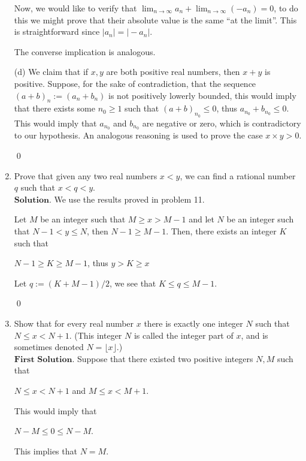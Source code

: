 \documentclass{article}
\theoremstyle{remark}
\begin{document}
\begin{enumerate}
        Now, we would like to verify that $\lim_{n\to\infty}a_n + \lim_{n\to\infty}(-a_n) = 0$,
        to do this we might prove that their absolute value is the same ``at the limit''.
        This is straightforward since $\vert a_n \vert = \vert -a_n \vert$.

        The converse implication is analogous.

        (d) We claim that if $x, y$ are both positive real numbers, then $x + y$ is positive.
        Suppose, for the sake of contradiction, that the sequence $(a + b)_n := (a_n + b_n)$ is not positively lowerly
        bounded, this would imply that there exists some $n_0 \geq 1$ such that $(a+b)_{n_0} \leq 0$, thus $a_{n_0}+b_{n_0} \leq 0$.
        This would imply that $a_{n_0}$ and $b_{n_0}$ are negative or zero, which is contradictory to our hypothesis.
        An analogous reasoning is used to prove the case $x \times y > 0$.

        \begin{flushleft}
            \qed
        \end{flushleft}
        \item Prove that given any two real numbers \( x < y \), 
        we can find a rational number \( q \) such that \( x < q < y \).\\
        $\textbf{Solution.}$
        We use the results proved in problem 11.

        Let $M$ be an integer such that $M \geq x > M-1$ and let $N$ be an integer such that $N - 1 < y \leq N$,
        then $N-1 \geq M-1$. Then, there exists an integer $K$ such that
        \begin{center}
            $N-1 \geq K \geq M-1$, thus $y > K \geq x$
        \end{center}
        Let $q := (K+M-1)/2$, we see that $K \leq q \leq M-1$.

        \begin{flushleft}
            \qed
        \end{flushleft}

        \item Show that for every real number \( x \) there is exactly one integer \( N \) such that 
        \( N \leq x < N + 1 \). (This integer \( N \) is called the integer part of \( x \), 
        and is sometimes denoted \( N = \lfloor x \rfloor \).)\\
        $\textbf{First Solution.}$ Suppose that there existed two positive integers $N, M$ such that 
        \begin{center}
            $N \leq x < N + 1$ and $M \leq x < M + 1$.
        \end{center}
        This would imply that 
        \begin{center}
            $N - M \leq 0 \leq N - M$.
        \end{center}
        This implies that $N = M$.


\end{enumerate}
\end{document}
